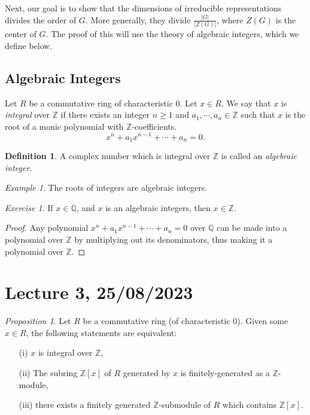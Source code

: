 \documentclass[a4paper]{report}
\theoremstyle{definition}
\newtheorem{definition}{Definition}
\theoremstyle{remark}
\theoremstyle{proposition}
\newtheorem{proposition}{Proposition}
\theoremstyle{conjecture}
\theoremstyle{lemma}
\theoremstyle{corollary}
\theoremstyle{exercise}
\newtheorem{exercise}{Exercise}
\theoremstyle{example}
\newtheorem{example}{Example}
\begin{document}
Next, our goal is to show that the dimensions of irreducible representations
divides the order of $G$. More generally, they divide $\frac{\vert G\vert}{\vert Z(G)\vert}$, where $Z(G)$ is the center of $G$. The proof of this will use 
the theory of algebraic integers, which we define below.

\subsection{Algebraic Integers}

Let $R$ be a commutative ring of characteristic $0$. Let $x\in R$. We 
say that $x$ is \emph{integral} over $\mathbb{Z}$ if there exists an integer
$n \geq 1$ and $a_1,\cdots, a_n\in\mathbb{Z}$ such that $x$ is the root 
of a monic polynomial with $\mathbb{Z}$-coefficients.
$$x^n + a_1x^{n-1} + \cdots + a_n = 0.$$

\begin{definition}
    A complex number which is integral over $\mathbb{Z}$ is called an 
    \emph{algebraic integer}. 
\end{definition}

\begin{example}
    The roots of integers are algebraic integers.
\end{example}

\begin{exercise}
    If $x \in \mathbb{Q}$, and $x$ is an algebraic integers, then 
    $x\in\mathbb{Z}$.
\end{exercise}

\begin{proof}
    Any polynomial $x^n + a_1x^{n-1} + \cdots + a_n = 0$
    over $\mathbb{Q}$ can be made into a polynomial over $\mathbb{Z}$ 
    by multiplying out its denominators, thus making it a 
    polynomial over $\mathbb{Z}$.
\end{proof}

\section{Lecture 3, 25/08/2023}

\begin{proposition}
    Let $R$ be a commutative ring (of characteristic $0$). Given some 
    $x \in R$, the following statements are equivalent:
    \begin{itemize}
        \item[(i)] $x$ is integral over $\mathbb{Z}$,
        \item[(ii)] The subring $\mathbb{Z}[x]$ of $R$ generated by $x$ 
            is finitely-generated as a $\mathbb{Z}$-module,
        \item[(iii)] there exists a finitely generated $\mathbb{Z}$-submodule 
            of $R$ which contains $\mathbb{Z}[x]$.
    \end{itemize}
\end{proposition}
\end{document}
